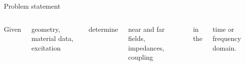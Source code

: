\documentclass[aspectratio=169, usenames, dvipsnames]{beamer}
\begin{document}
\begin{frame}{Problem statement}
  \begin{columns}
      Given
      \begin{center}
        geometry, material data, excitation
      \end{center}
      determine
      \begin{center}
        near and far fields, impedances, coupling
      \end{center}
      in the
      \begin{center}
        time or frequency domain.
      \end{center}

      \centering

  \end{columns}
\end{frame}
\end{document}
